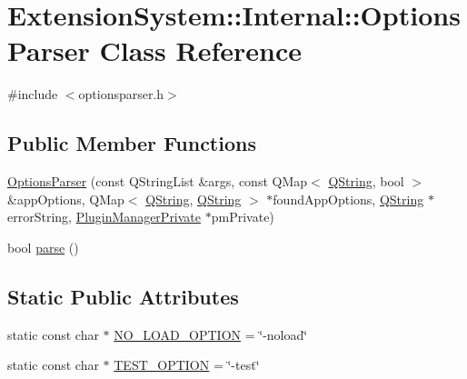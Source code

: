 \hypertarget{class_extension_system_1_1_internal_1_1_options_parser}{\section{\-Extension\-System\-:\-:\-Internal\-:\-:\-Options\-Parser \-Class \-Reference}
\label{class_extension_system_1_1_internal_1_1_options_parser}
}


{\ttfamily \#include $<$optionsparser.\-h$>$}

\subsection*{\-Public \-Member \-Functions}
\begin{DoxyCompactItemize}
\item 
\hyperlink{class_extension_system_1_1_internal_1_1_options_parser_acf0ee2e8b5fef5233c8b2f35a588f761}{\-Options\-Parser} (const \-Q\-String\-List \&args, const \-Q\-Map$<$ \hyperlink{group___u_a_v_objects_plugin_gab9d252f49c333c94a72f97ce3105a32d}{\-Q\-String}, bool $>$ \&app\-Options, \-Q\-Map$<$ \hyperlink{group___u_a_v_objects_plugin_gab9d252f49c333c94a72f97ce3105a32d}{\-Q\-String}, \hyperlink{group___u_a_v_objects_plugin_gab9d252f49c333c94a72f97ce3105a32d}{\-Q\-String} $>$ $\ast$found\-App\-Options, \hyperlink{group___u_a_v_objects_plugin_gab9d252f49c333c94a72f97ce3105a32d}{\-Q\-String} $\ast$error\-String, \hyperlink{class_extension_system_1_1_internal_1_1_plugin_manager_private}{\-Plugin\-Manager\-Private} $\ast$pm\-Private)
\item 
bool \hyperlink{class_extension_system_1_1_internal_1_1_options_parser_a9e2daeafd44e4d07e6b38a0629a47bd5}{parse} ()
\end{DoxyCompactItemize}
\subsection*{\-Static \-Public \-Attributes}
\begin{DoxyCompactItemize}
\item 
static const char $\ast$ \hyperlink{class_extension_system_1_1_internal_1_1_options_parser_a4750d20fa380d4217b6247d0953ea975}{\-N\-O\-\_\-\-L\-O\-A\-D\-\_\-\-O\-P\-T\-I\-O\-N} = \char`\"{}-\/noload\char`\"{}
\item 
static const char $\ast$ \hyperlink{class_extension_system_1_1_internal_1_1_options_parser_a0fa18d9e88d365b1a49705ed70e87a90}{\-T\-E\-S\-T\-\_\-\-O\-P\-T\-I\-O\-N} = \char`\"{}-\/test\char`\"{}
\end{DoxyCompactItemize}



